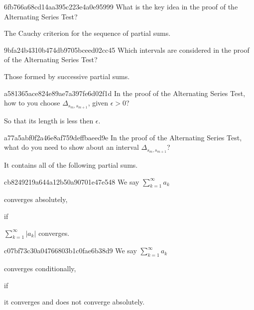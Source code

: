 \begin{note}{6fb766a68cd14aa395c223e4a0e95999}
    What is the key idea in the proof of the Alternating Series Test?

    \begin{cloze}{1}
        The Cauchy criterion for the sequence of partial sums.
    \end{cloze}
\end{note}

\begin{note}{9bfa24b4310b474db9705bceed02cc45}
    Which intervals are considered in the proof of the Alternating Series Test?

    \begin{cloze}{1}
        Those formed by successive partial sums.
    \end{cloze}
\end{note}

\begin{note}{a581365ace824e89ae7a397fe6d02f1d}
    In the proof of the Alternating Series Test, how to you choose \({ \Delta_{s_m, s_{m+1}} }\), given \({ \epsilon > 0 }\)?

    \begin{cloze}{1}
        So that its length is less then \({ \epsilon }\).
    \end{cloze}
\end{note}

\begin{note}{a77a5abf0f2a46e8af759deffbaeed9e}
    In the proof of the Alternating Series Test, what do you need to show about an interval \({ \Delta_{s_m, s_{m+1}} }\)?

    \begin{cloze}{1}
        It contains all of the following partial sums.
    \end{cloze}
\end{note}

\begin{note}{cb8249219a644a12b50a90701e47e548}
    We say \({ \sum_{k=1}^{\infty} a_k }\) \begin{icloze}{2}converges absolutely,\end{icloze} if \begin{icloze}{1}\({ \sum_{k=1}^{\infty} \left\lvert a_k \right\rvert }\) converges.\end{icloze}
\end{note}

\begin{note}{c07bf73c30a04766803b1c0fae6b38d9}
    We say \({ \sum_{k=1}^{\infty} a_k }\) \begin{icloze}{2}converges conditionally,\end{icloze} if \begin{icloze}{1}it converges and does not converge absolutely.\end{icloze}
\end{note}

